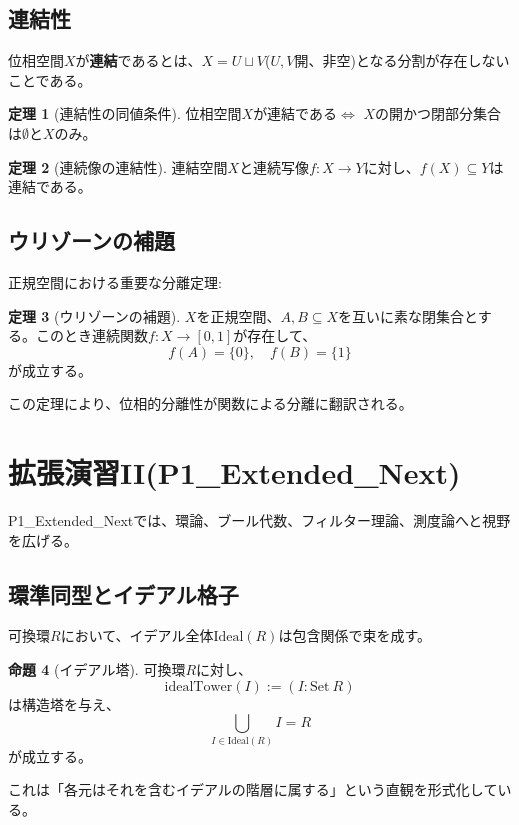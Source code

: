 \documentclass[a4paper,12pt]{ltjsarticle}
\theoremstyle{definition}
\newtheorem{theorem}{定理}[section]
\newtheorem{proposition}[theorem]{命題}
\begin{document}
\subsection{連結性}
位相空間$X$が\textbf{連結}であるとは、$X = U \sqcup V$($U, V$開、非空)となる分割が存在しないことである。

\begin{theorem}[連結性の同値条件]\label{thm:connected-clopen}
位相空間$X$が連結である$\iff$ $X$の開かつ閉部分集合は$\emptyset$と$X$のみ。
\end{theorem}

\begin{theorem}[連続像の連結性]\label{thm:continuous-connected}
連結空間$X$と連続写像$f: X \to Y$に対し、$f(X) \subseteq Y$は連結である。
\end{theorem}

\subsection{ウリゾーンの補題}
正規空間における重要な分離定理:

\begin{theorem}[ウリゾーンの補題]\label{thm:urysohn}
$X$を正規空間、$A, B \subseteq X$を互いに素な閉集合とする。このとき連続関数$f: X \to [0,1]$が存在して、
\[
f(A) = \{0\}, \quad f(B) = \{1\}
\]
が成立する。
\end{theorem}

この定理により、位相的分離性が関数による分離に翻訳される。

\section{拡張演習II(P1\_Extended\_Next)}

P1\_Extended\_Nextでは、環論、ブール代数、フィルター理論、測度論へと視野を広げる。

\subsection{環準同型とイデアル格子}
可換環$R$において、イデアル全体$\text{Ideal}(R)$は包含関係で束を成す。

\begin{proposition}[イデアル塔]\label{prop:ideal-tower}
可換環$R$に対し、
\[
\text{idealTower}(I) := (I: \text{Set}\ R)
\]
は構造塔を与え、
\[
\bigcup_{I \in \text{Ideal}(R)} I = R
\]
が成立する。
\end{proposition}

これは「各元はそれを含むイデアルの階層に属する」という直観を形式化している。
\end{document}
